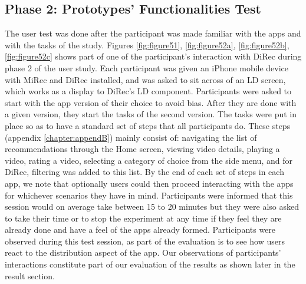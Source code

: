 \subsection{Phase 2: Prototypes' Functionalities Test}
The user test was done after the participant was made familiar with the apps and
with the tasks of the study. Figures \ref{fig:figure51}, \ref{fig:figure52a},
\ref{fig:figure52b}, \ref{fig:figure52c} shows part of one of the participant's
interaction with DiRec during phase 2 of the user study. Each participant was given an iPhone mobile device with MiRec and DiRec installed, and was asked to sit across of an LD screen, which works as a display to DiRec's LD component.
Participants were asked to start with the app version of their choice to avoid
bias. After they are done with a given version, they start the tasks of the
second version. The tasks were put in place so as to have a standard set of
steps that all participants do. These steps (appendix \ref{chapter:appendB})
mainly consist of:
navigating the list of recommendations through the Home screen, viewing video details, playing
a video, rating a video, selecting a category of choice from the side menu, and
for DiRec, filtering was added to this list. By the end of each set of steps in
each app, we note that optionally users could then proceed interacting with the
apps for whichever scenarios they have in mind. Participants were informed that
this session would on average take between 15 to 20 minutes but they were also
asked to take their time or to stop the experiment at any time if they feel they
are already done and have a feel of the apps already formed. Participants were
observed during this test session, as part of the evaluation is to see how users react to the distribution aspect of the app.
Our observations of participants' interactions constitute part of our evaluation
of the results as shown later in the result section.


